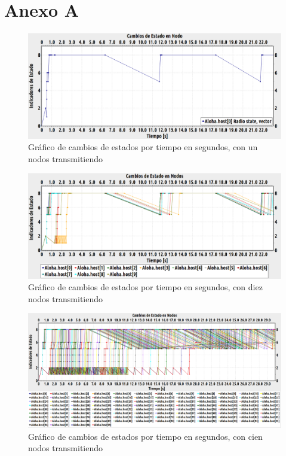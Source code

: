 \chapter{Anexo A}

\begin{figure}[!ht]
\centering
\includegraphics[angle=270, scale=0.4]{images/cambioestado1nodo-ideal.eps}
\caption{Gráfico de cambios de estados por tiempo en segundos, con un nodos transmitiendo}
\label{anexa:1}
\end{figure}

\begin{figure}[!ht]
\centering
\includegraphics[angle=270, scale=0.4]{images/cambioestado10nodos.eps}
\caption{Gráfico de cambios de estados por tiempo en segundos, con diez nodos transmitiendo}
\label{anexa:2}
\end{figure}

\begin{figure}[!ht]
\centering
\includegraphics[angle=270, scale=0.3]{images/cambioestado100nodos.eps}
\caption{Gráfico de cambios de estados por tiempo en segundos, con cien nodos transmitiendo}
\label{anexa:3}
\end{figure}

